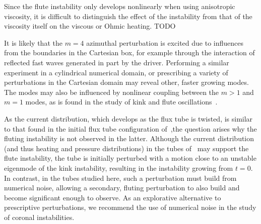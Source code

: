 \documentclass[fleqn,usenatbib]{mnras}
\newcommand{\rev}[1]{{\color{red} #1}}
\begin{document}
\rev{Since the flute instability only develops nonlinearly when using anisotropic viscosity, it is difficult to distinguish the effect of the instability from that of the viscosity itself on the viscous or Ohmic heating. TODO}

It is likely that the $m=4$ azimuthal perturbation is excited due to influences
from the boundaries in the Cartesian box, for example through the interaction
of reflected fast waves generated in part by the driver. Performing a similar
experiment in a cylindrical numerical domain, or prescribing a variety of
perturbations in the Cartesian domain may reveal other, faster growing modes.
The modes may also be influenced by nonlinear coupling between the $m>1$ and
$m=1$ modes, as is found in the study of kink and flute
oscillations~\citep{terradasEffectMagneticTwist2018,rudermanNonlinearGenerationFluting2017}. 

As the current distribution, which develops as the flux tube is twisted, is
similar to that found in the initial flux tube configuration
of~\cite{quinnEffectAnisotropicViscosity2020},the question arises why the
fluting instability is not observed in the latter. Although the current
distribution (and thus heating and pressure distributions) in the tubes
of~\cite{quinnEffectAnisotropicViscosity2020} may support the flute
instability, the tube is initially perturbed with a motion close to an unstable
eigenmode of the kink instability, resulting in the instability growing from
$t=0$. In contrast, in the tubes studied here, such a perturbation must build
from numerical noise, allowing a secondary, fluting perturbation to also build
and become significant enough to observe. \rev{As an explorative alternative to
prescriptive perturbations, we recommend the use of numerical noise in the
study of coronal instabilities.}
\end{document}
